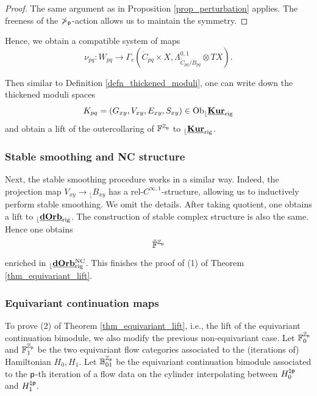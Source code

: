 \documentclass[reqno, 10pt]{amsart}
\numberwithin{equation}{section}
\numberwithin{equation}{section}
\theoremstyle{definition}
\theoremstyle{remark}
\newcommand{\beqn}{\begin{equation*}}
\newcommand{\eeqn}{\end{equation*}}
\newcommand{\mb}{\mathbb}
\newcommand{\p}{{\sf p}}
\newcommand{\zp}{{{\mb Z}_{\sf p}}}
\renewcommand{\outer}{{}_{\lfloor}}
\newcommand{\uds}[1]{\underline{\smash{#1}}}
\begin{document}
\begin{proof}
The same argument as in Proposition \ref{prop_perturbation} applies. The freeness of the $\mb\Pi_\p$-action allows us to maintain the symmetry. 
\end{proof}

Hence, we obtain a compatible system of maps
\beqn
\nu_{pq}: W_{pq} \to \Gamma_c ( \mathring C_{pq} \times X, \Lambda_{\mathring C_{pq}/ B_{pq}}^{0,1}\otimes TX). 
\eeqn

Then similar to Definition \ref{defn_thickened_moduli}, one can write down the thickened moduli spaces 
\beqn
K_{pq} = (G_{xy}, V_{xy}, E_{xy}, S_{xy}) \in {\rm Ob}\outer \uds{\bf Kur}_{\rm rig}
\eeqn
and obtain a lift of the outercollaring of ${\mb F}^{\zp}$ to $\outer \uds{\bf Kur}_{\rm rig}$. 

\subsubsection{Stable smoothing and NC structure}

Next, the stable smoothing procedure works in a similar way. Indeed, the projection map $V_{xy} \to \outer B_{xy}$ has a {\rm rel}-$C^{\infty, 1}$-structure, allowing us to inductively perform stable smoothing. We omit the details. After taking quotient, one obtains a lift to $\outer \uds{\bf dOrb}_{\rm rig}$. The construction of stable complex structure is also the same. Hence one obtains
\beqn
\tilde{\mb F}^\zp
\eeqn
enriched in $\outer \uds{\bf dOrb}^{\rm NC}_{\rm rig}$. This finishes the proof of (1) of Theorem \ref{thm_equivariant_lift}. 

\subsubsection{Equivariant continuation maps}

To prove (2) of Theorem \ref{thm_equivariant_lift}, i.e., the lift of the equivariant continuation bimodule, we also modify the previous non-equivariant case. Let ${\mb F}_0^\zp$ and $\mb{F}_1^\zp$ be the two equivariant flow categories associated to the (iterations of) Hamiltonian $H_0, H_1$. Let $\mb{B}_{01}^\zp$ be the equivariant continuation bimodule associated to the $\p$-th iteration of a flow data on the cylinder interpolating between $H_0^{\natural \p}$ and $H_1^{\natural \p}$. 
\end{document}
